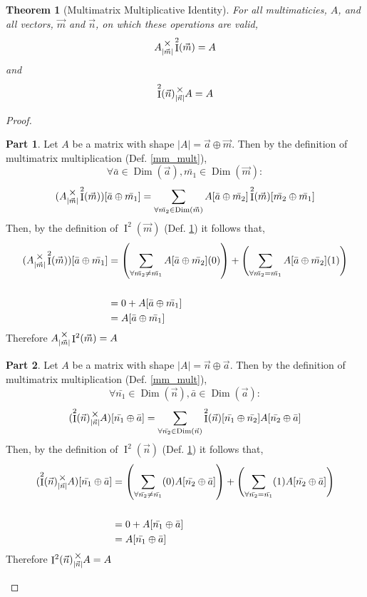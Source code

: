 \documentclass[12pt]{book}
\theoremstyle{plain}
\newtheorem{theorem}{Theorem}[chapter]
\theoremstyle{definition}
\theoremstyle{ppart}
\newtheorem{ppart}{Part}
\theoremstyle{case}
\theoremstyle{solution}
\DeclareMathOperator{\Dim}{Dim}
\DeclareMathOperator{\Ident}{I}
\newcommand{\mmult}[1]{\text{\raisebox{1ex}{$\underset{#1}{\times}$}}}
\newcommand{\shape}[1]{\left|#1\right|}
\begin{document}
\begin{theorem}[Multimatrix Multiplicative Identity]
\label{mm_ident}
For all multimaticies, $A$, and all vectors, $\vec{m}$ and $\vec{n}$,  on which
these operations are valid,
\[
 A \mmult{\shape{\vec{m}}} \Ident^2(\vec{m}) = A
\]
and
\[
 \Ident^2(\vec{n}) \mmult{\shape{\vec{n}}} A = A
\]
\end{theorem}
\begin{proof}
\begin{ppart}
Let $A$ be a matrix with shape $\shape{A} = \vec{a} \oplus \vec{m}$.
Then by the definition of multimatrix multiplication (Def. \ref{mm_mult}),
\[ \forall \bar{a} \in \Dim(\vec{a}), \bar{m_1} \in \Dim(\vec{m}) : \]
\[
 (A \mmult{\shape{\vec{m}}} \Ident^2(\vec{m}))[\bar{a} \oplus \bar{m_1}]
 =
 \sum_{\forall \bar{m_2} \in \Dim(\vec{m})}
 A[\bar{a} \oplus \bar{m_2}] \Ident^2(\vec{m})[\bar{m_2} \oplus \bar{m_1}]
\]
Then, by the definition of $\Ident^2(\vec{m})$ (Def. \ref{mm_ident}) it follows
that,
\begin{align*}
 (A \mmult{\shape{\vec{m}}} \Ident^2(\vec{m}))[\bar{a} \oplus \bar{m_1}]
 &=
 \left(
  \sum_{\forall \bar{m_2} \ne \bar{m_1}}
  A[\bar{a} \oplus \bar{m_2}] (0)
 \right)
 +
 \left(
  \sum_{\forall \bar{m_2} = \bar{m_1}}
  A[\bar{a} \oplus \bar{m_2}] (1)
 \right) \\
 \\
 &= 0 + A[\bar{a} \oplus \bar{m_1}] \\
 &= A[\bar{a} \oplus \bar{m_1}]
\end{align*}
Therefore $A \mmult{\shape{\vec{m}}} \Ident^2(\vec{m}) = A$
\end{ppart}
\begin{ppart}
Let $A$ be a matrix with shape $\shape{A} = \vec{n} \oplus \vec{a}$.
Then by the definition of multimatrix multiplication (Def. \ref{mm_mult}),
\[ \forall  \bar{n_1} \in \Dim(\vec{n}), \bar{a} \in \Dim(\vec{a}) : \]
\[
 (\Ident^2(\vec{n}) \mmult{\shape{\vec{n}}} A)[\bar{n_1} \oplus \bar{a}]
 =
 \sum_{\forall \bar{n_2} \in \Dim(\vec{n})}
 \Ident^2(\vec{n})[\bar{n_1} \oplus \bar{n_2}]A[\bar{n_2} \oplus \bar{a}] 
\]
Then, by the definition of $\Ident^2(\vec{n})$ (Def. \ref{mm_ident}) it follows
that,
\begin{align*}
 (\Ident^2(\vec{n}) \mmult{\shape{\vec{n}}} A)[\bar{n_1} \oplus \bar{a}]
 &=
 \left(
  \sum_{\forall \bar{n_2} \ne \bar{n_1}}
  (0) A[\bar{n_2} \oplus \bar{a}]
 \right)
 +
 \left(
  \sum_{\forall \bar{n_2} = \bar{n_1}}
  (1) A[\bar{n_2} \oplus \bar{a}]
 \right) \\
 \\
 &= 0 + A[\bar{n_1} \oplus \bar{a}] \\
 &= A[\bar{n_1} \oplus \bar{a}]
\end{align*}
Therefore $\Ident^2(\vec{n}) \mmult{\shape{\vec{n}}} A = A$
\end{ppart}
\end{proof}
\end{document}

